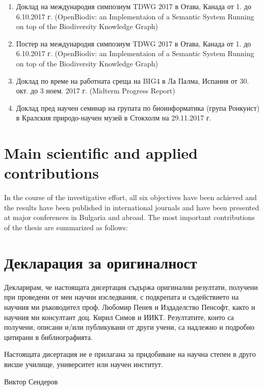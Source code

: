 \begin{enumerate}
    \item Доклад на международия симпозиум TDWG 2017 в Отава, Канада от 1. до 6.10.2017 г. (OpenBiodiv: an Implementaion of a Semantic System Running on top of the Biodiversity Knowledge Graph)
    \item Постер на международия симпозиум TDWG 2017 в Отава, Канада от 1. до 6.10.2017 г. (OpenBiodiv: an Implementaion of a Semantic System Running on top of the Biodiversity Knowledge Graph)
    \item Доклад по време на работната среща на BIG4 в Ла Палма, Испания от 30. окт. до 3 ноем. 2017 г. (Midterm Progress Report)
    \item Доклад пред научен семинар на групата по биоинформатика (група Ронкуист) в Кралския природо-научен музей в Стокхолм на 29.11.2017 г.
\end{enumerate}

\section*{Main scientific and applied contributions}

In the course of the investigative effort, all six objectives have been achieved and the results have been published in international journals and have been presented at major conferences in Bulgaria and abroad. The most important contributions of the thesis are summarized as follows:

\section*{Декларация за оригиналност}

Декларирам, че настоящата дисертация съдържа оригинални резултати, получени 
при проведени от мен научни изследвания, с подкрепата и съдействието на научния ми ръководител проф. Любомир Пенев и Издаделство Пенсофт, както и научния ми консултант доц. Кирил Симов и ИИКТ.  Резултатите,  които  са  получени,  описани  и/или  публикувани  от  други учени, са надлежно и подробно цитирани в библиографията.

Настоящата дисертация не е прилагана за придобиване на научна степен в друго 
висше училище, университет или научен институт.

Виктор Сендеров


